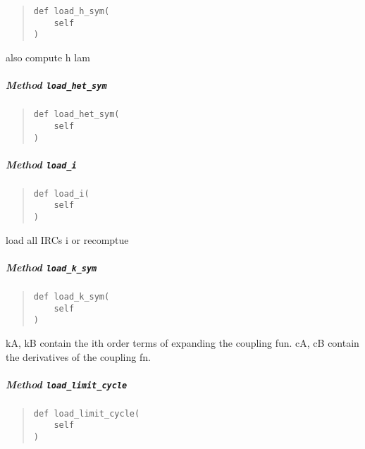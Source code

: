\documentclass[
  english,
  a4paper,
  oneside]{article}
\begin{document}
\begin{quote}
\begin{verbatim}
def load_h_sym(
    self
)
\end{verbatim}
\end{quote}

also compute h lam

\hypertarget{StrongCoupling.StrongCoupling.load_het_sym}{%
\subparagraph{\texorpdfstring{Method
\texttt{load\_het\_sym}}{Method load\_het\_sym}}\label{StrongCoupling.StrongCoupling.load_het_sym}}

\begin{quote}
\begin{verbatim}
def load_het_sym(
    self
)
\end{verbatim}
\end{quote}

\hypertarget{StrongCoupling.StrongCoupling.load_i}{%
\subparagraph{\texorpdfstring{Method
\texttt{load\_i}}{Method load\_i}}\label{StrongCoupling.StrongCoupling.load_i}}

\begin{quote}
\begin{verbatim}
def load_i(
    self
)
\end{verbatim}
\end{quote}

load all IRCs i or recomptue

\hypertarget{StrongCoupling.StrongCoupling.load_k_sym}{%
\subparagraph{\texorpdfstring{Method
\texttt{load\_k\_sym}}{Method load\_k\_sym}}\label{StrongCoupling.StrongCoupling.load_k_sym}}

\begin{quote}
\begin{verbatim}
def load_k_sym(
    self
)
\end{verbatim}
\end{quote}

kA, kB contain the ith order terms of expanding the coupling fun. cA, cB
contain the derivatives of the coupling fn.

\hypertarget{StrongCoupling.StrongCoupling.load_limit_cycle}{%
\subparagraph{\texorpdfstring{Method
\texttt{load\_limit\_cycle}}{Method load\_limit\_cycle}}\label{StrongCoupling.StrongCoupling.load_limit_cycle}}

\begin{quote}
\begin{verbatim}
def load_limit_cycle(
    self
)
\end{verbatim}
\end{quote}
\end{document}
